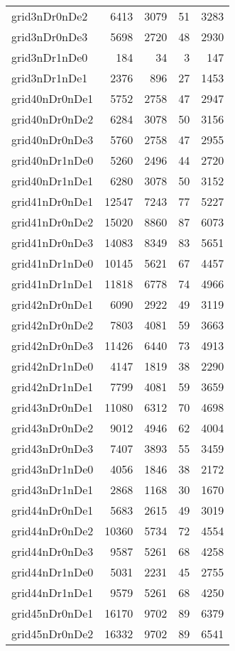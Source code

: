 \begin{longtable}{lrrrr}
grid3nDr0nDe2 & 6413 & 3079 & 51 & 3283 \\
grid3nDr0nDe3 & 5698 & 2720 & 48 & 2930 \\
grid3nDr1nDe0 & 184 & 34 & 3 & 147 \\
grid3nDr1nDe1 & 2376 & 896 & 27 & 1453 \\
grid40nDr0nDe1 & 5752 & 2758 & 47 & 2947 \\
grid40nDr0nDe2 & 6284 & 3078 & 50 & 3156 \\
grid40nDr0nDe3 & 5760 & 2758 & 47 & 2955 \\
grid40nDr1nDe0 & 5260 & 2496 & 44 & 2720 \\
grid40nDr1nDe1 & 6280 & 3078 & 50 & 3152 \\
grid41nDr0nDe1 & 12547 & 7243 & 77 & 5227 \\
grid41nDr0nDe2 & 15020 & 8860 & 87 & 6073 \\
grid41nDr0nDe3 & 14083 & 8349 & 83 & 5651 \\
grid41nDr1nDe0 & 10145 & 5621 & 67 & 4457 \\
grid41nDr1nDe1 & 11818 & 6778 & 74 & 4966 \\
grid42nDr0nDe1 & 6090 & 2922 & 49 & 3119 \\
grid42nDr0nDe2 & 7803 & 4081 & 59 & 3663 \\
grid42nDr0nDe3 & 11426 & 6440 & 73 & 4913 \\
grid42nDr1nDe0 & 4147 & 1819 & 38 & 2290 \\
grid42nDr1nDe1 & 7799 & 4081 & 59 & 3659 \\
grid43nDr0nDe1 & 11080 & 6312 & 70 & 4698 \\
grid43nDr0nDe2 & 9012 & 4946 & 62 & 4004 \\
grid43nDr0nDe3 & 7407 & 3893 & 55 & 3459 \\
grid43nDr1nDe0 & 4056 & 1846 & 38 & 2172 \\
grid43nDr1nDe1 & 2868 & 1168 & 30 & 1670 \\
grid44nDr0nDe1 & 5683 & 2615 & 49 & 3019 \\
grid44nDr0nDe2 & 10360 & 5734 & 72 & 4554 \\
grid44nDr0nDe3 & 9587 & 5261 & 68 & 4258 \\
grid44nDr1nDe0 & 5031 & 2231 & 45 & 2755 \\
grid44nDr1nDe1 & 9579 & 5261 & 68 & 4250 \\
grid45nDr0nDe1 & 16170 & 9702 & 89 & 6379 \\
grid45nDr0nDe2 & 16332 & 9702 & 89 & 6541 \\

\end{longtable}
